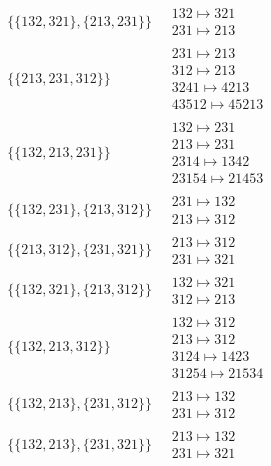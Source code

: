\begin{scriptsize}
\begin{align}
\\
\{\{132, 321\}, \{213, 231\}\}
\ 
&
\begin{matrix}
132 \mapsto 321\\231 \mapsto 213
\end{matrix}
\\
\{\{213, 231, 312\}\}
\ 
&
\begin{matrix}
231 \mapsto 213\\312 \mapsto 213\\3241 \mapsto 4213\\43512 \mapsto 45213
\end{matrix}
\\
\{\{132, 213, 231\}\}
\ 
&
\begin{matrix}
132 \mapsto 231\\213 \mapsto 231\\2314 \mapsto 1342\\23154 \mapsto 21453
\end{matrix}
\\
\{\{132, 231\}, \{213, 312\}\}
\ 
&
\begin{matrix}
231 \mapsto 132\\213 \mapsto 312
\end{matrix}
\\
\{\{213, 312\}, \{231, 321\}\}
\ 
&
\begin{matrix}
213 \mapsto 312\\231 \mapsto 321
\end{matrix}
\\
\{\{132, 321\}, \{213, 312\}\}
\ 
&
\begin{matrix}
132 \mapsto 321\\312 \mapsto 213
\end{matrix}
\\
\{\{132, 213, 312\}\}
\ 
&
\begin{matrix}
132 \mapsto 312\\213 \mapsto 312\\3124 \mapsto 1423\\31254 \mapsto 21534
\end{matrix}
\\
\{\{132, 213\}, \{231, 312\}\}
\ 
&
\begin{matrix}
213 \mapsto 132\\231 \mapsto 312
\end{matrix}
\\
\{\{132, 213\}, \{231, 321\}\}
\ 
&
\begin{matrix}
213 \mapsto 132\\231 \mapsto 321

\end{matrix}
\end{align}
\end{scriptsize}
